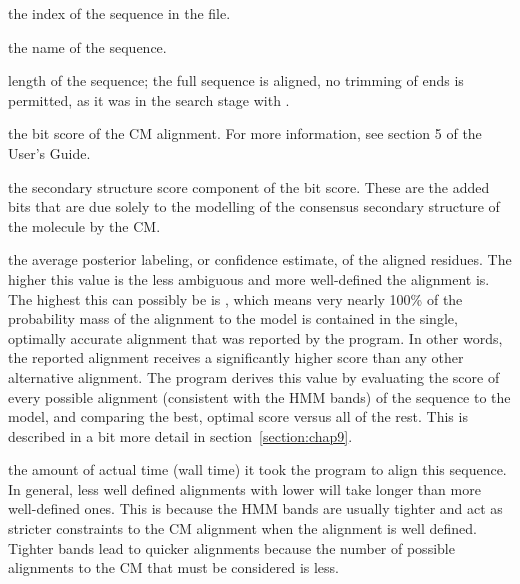 \begin{wideitem}
\item[\emprog{seq idx}] the index of the sequence in the file.

\item[\emprog{seq name}] the name of the sequence.

\item[\emprog{len}] length of the sequence; the full sequence is
  aligned, no trimming of ends is permitted, as it was in the search
  stage with .

\item[\emprog{total}] the bit score of the CM alignment. For more
  information, see section 5 of the  User's Guide.

\item[\emprog{struct}] the secondary structure score component of the
   bit score. These are the added bits that are due solely
  to the modelling of the consensus secondary structure of the
  molecule by the CM\@. 
  
\item[\emprog{avg prob}] the average posterior labeling, or confidence
  estimate, of the aligned residues. The higher this value is the less
  ambiguous and more well-defined the alignment is. The highest this
  can possibly be is , which means very nearly 100\% of
  the probability mass of the alignment to the model is contained in
  the single, optimally accurate alignment that was reported by the
  program. In other words, the reported alignment receives a
  significantly higher score than any other alternative alignment. The
  program derives this value by evaluating the score of every possible
  alignment (consistent with the HMM bands) of the sequence to the
  model, and comparing the best, optimal score versus all of the
  rest. This is described in a bit more detail in section~\ref{section:chap9}.

\item[\emprog{elapsed}] the amount of actual time (wall time) it took
  the program to align this sequence. In general, less well defined
  alignments with lower  will take longer than more
  well-defined ones. This is because the HMM bands are usually tighter
  and act as stricter constraints to the CM alignment when the
  alignment is well defined. Tighter bands lead to quicker alignments
  because the number of possible alignments to the CM that must be
  considered is less.
\end{wideitem}

